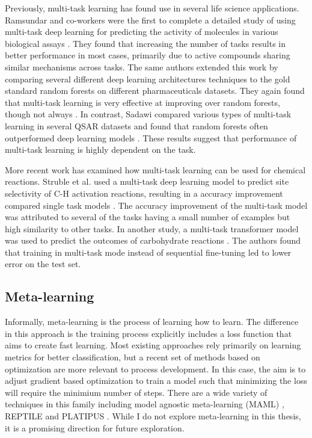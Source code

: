 Previously, multi-task learning has found use in several life science applications. Ramsundar and co-workers were the first to complete a detailed study of using multi-task deep learning for predicting the activity of molecules in various biological assays \cite{Ramsundar2015}. They found that increasing the number of tasks results in better performance in most cases, primarily due to active compounds sharing similar mechanisms across tasks. The same authors extended this work by comparing several different deep learning architectures techniques to the gold standard random forests on different pharmaceuticals datasets. They again found that multi-task learning is very effective at improving over random forests, though not always \cite{Ramsundar2017}. In contrast, Sadawi compared various types of multi-task learning in several QSAR datasets and found that random forests often outperformed deep learning models \cite{Sadawi2019}. These results suggest that performance of multi-task learning is highly dependent on the task.

More recent work has examined how multi-task learning can be used for chemical reactions. Struble et al. used a multi-task deep learning model to predict site selectivity of C-H activation reactions, resulting in a accuracy improvement compared single task models \cite{Struble2020}. The accuracy improvement of the multi-task model was attributed to several of the tasks having a small number of examples but high similarity to other tasks. In another study, a multi-task transformer model was used to predict the outcomes of carbohydrate reactions \cite{Pesciullesi2020}. The authors found that training in multi-task mode instead of sequential fine-tuning led to lower error on the test set. 

\subsection{Meta-learning}

Informally, meta-learning is the process of learning how to learn. The difference in this approach is the training process explicitly includes a loss function that aims to create fast learning. Most existing approaches rely primarily on learning metrics for better classification, but a recent set of methods based on optimization are more relevant to process development. 
In this case, the aim is to adjust gradient based optimization to train a model such that minimizing the loss will require the minimium number of steps. There are a wide variety of techniques in this family including model agnostic meta-learning (MAML) \cite{Finn2017}, REPTILE \cite{Nichols2018} and PLATIPUS \cite{Finn2018}. While I do not explore meta-learning in this thesis, it is a promising direction for future exploration.


